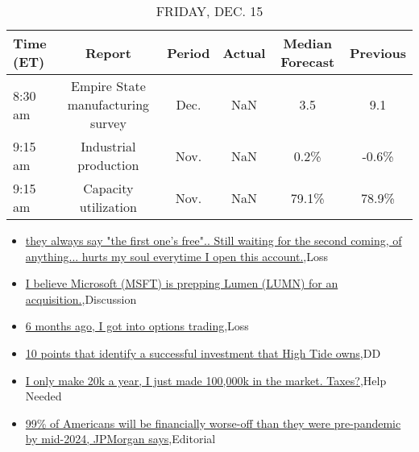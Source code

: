 \documentclass{article}%
\begin{document}
%


\begin{table}[htbp]%
\caption{FRIDAY, DEC. 15}%
\centering%
\begin{adjustbox}{width=1\textwidth}%
\begin{tabular}{lccccc}
\toprule
Time (ET) &                            Report & Period & Actual & Median Forecast & Previous \\
\midrule
  8:30 am & Empire State manufacturing survey &   Dec. &    NaN &             3.5 &      9.1 \\
  9:15 am &             Industrial production &   Nov. &    NaN &            0.2\% &    -0.6\% \\
  9:15 am &              Capacity utilization &   Nov. &    NaN &           79.1\% &    78.9\% \\
\bottomrule
\end{tabular}
%
\end{adjustbox}%
\end{table}

%
\begin{itemize}%
\item%
\href{https://reddit.com/r/wallstreetbets/comments/18fnx0l/they\_always\_say\_the\_first\_ones\_free\_still\_waiting/}{they always say "the first one's free".. Still waiting for the second coming, of anything... hurts my soul everytime I open this account.},Loss%
\item%
\href{https://reddit.com/r/wallstreetbets/comments/18fn1n6/i\_believe\_microsoft\_msft\_is\_prepping\_lumen\_lumn/}{I believe Microsoft (MSFT) is prepping Lumen (LUMN) for an acquisition.},Discussion%
\item%
\href{https://reddit.com/r/wallstreetbets/comments/18fmlu6/6\_months\_ago\_i\_got\_into\_options\_trading/}{6 months ago, I got into options trading},Loss%
\item%
\href{https://reddit.com/r/Baystreetbets/comments/18f0cmi/10\_points\_that\_identify\_a\_successful\_investment/}{10 points that identify a successful investment that High Tide owns},DD%
\item%
\href{https://reddit.com/r/StockMarket/comments/18ex7ag/i\_only\_make\_20k\_a\_year\_i\_just\_made\_100000k\_in\_the/}{I only make 20k a year, I just made 100,000k in the market. Taxes?},Help Needed%
\item%
\href{https://reddit.com/r/Economics/comments/18fjviv/99\_of\_americans\_will\_be\_financially\_worseoff\_than/}{99\% of Americans will be financially worse-off than they were pre-pandemic by mid-2024, JPMorgan says},Editorial%
\end{itemize}%
\end{document}
